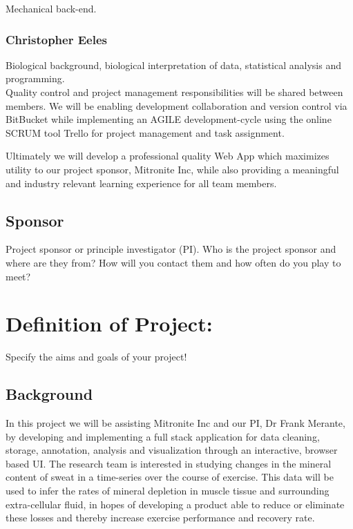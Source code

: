 \documentclass[10pt,twocolumn,letterpaper]{article}
\begin{document}
                Mechanical back-end.
            
                \subsubsection*{Christopher Eeles}
                
                Biological background, biological interpretation of data, statistical analysis and programming. \\
            
            Quality control and project management responsibilities will be shared between members. We will be enabling development collaboration and version control via BitBucket while implementing an AGILE development-cycle using the online SCRUM tool Trello for project management and task assignment. 
            
            Ultimately we will develop a professional quality Web App which maximizes utility to our project sponsor, Mitronite Inc, while also providing a meaningful and industry relevant learning experience for all team members. 
            
            \subsection{Sponsor}
            
            Project sponsor or principle investigator (PI). Who is the project sponsor and where are they from? How will you contact them and how often do you play to meet?
        
		\section{Definition of Project:}
        
        Specify the aims and goals of your project!
        
            \subsection{Background}
            
            In this project we will be assisting Mitronite Inc and our PI, Dr Frank Merante, by developing and implementing a full stack application for data cleaning, storage, annotation, analysis and visualization through an interactive, browser based UI. The research team is interested in studying changes in the mineral content of sweat in a time-series over the course of exercise. This data will be used to infer the rates of mineral depletion in muscle tissue and surrounding extra-cellular fluid, in hopes of developing a product able to reduce or eliminate these losses and thereby increase exercise performance and recovery rate. 
            
\end{document}
